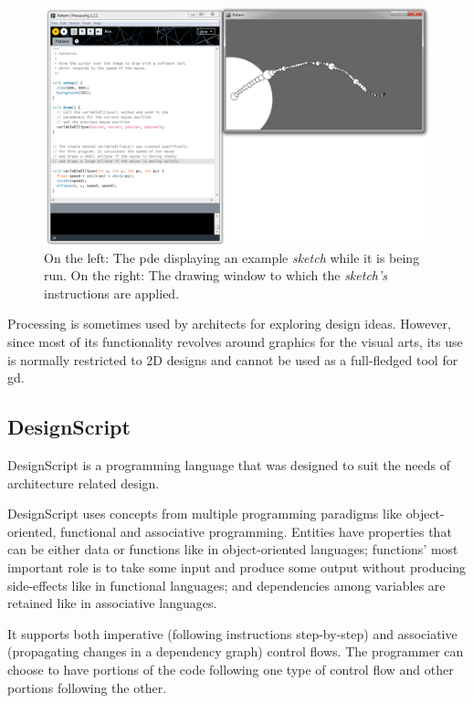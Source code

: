 \begin{figure}
	\centering
	\includegraphics[width=1.0\textwidth]{images/proc_dev_env}
	\caption{On the left: The \gls{pde} displaying an example \emph{sketch} while it is being run. On the right: The drawing window to which the \emph{sketch's} instructions are applied.}
	\label{fig:proc:dev:env}
\end{figure}

Processing is sometimes used by architects for exploring design ideas.
However, since most of its functionality revolves around graphics for the visual arts, its use is normally restricted to 2D designs and cannot be used as a full-fledged tool for \gls{gd}.


\subsection{DesignScript}
\label{section:designscript:related}
DesignScript\cite{aish2012designscript} is a programming language that was designed to suit the needs of architecture related design.

DesignScript uses concepts from multiple programming paradigms like object-oriented, functional and associative programming.
Entities have properties that can be either data or functions like in object-oriented languages; functions' most important role is to take some input and produce some output without producing side-effects like in functional languages; and dependencies among variables are retained like in associative languages.

It supports both imperative (following instructions step-by-step) and associative (propagating changes in a dependency graph) control flows.
The programmer can choose to have portions of the code following one type of control flow and other portions following the other.

